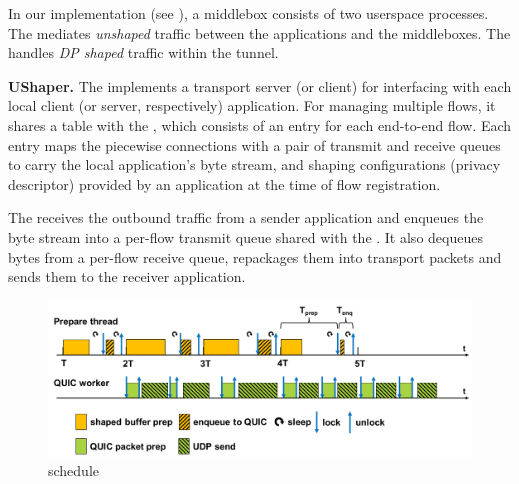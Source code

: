 In our implementation (see ), a middlebox consists of
two userspace processes. The
{\ushaper} mediates {\em unshaped} traffic between the applications and the
middleboxes. The {\dshaper} handles {\em DP shaped} traffic within the tunnel.

\textbf{UShaper.}
The {\ushaper} implements a transport server (or client) for interfacing with
each local client (or server, respectively) application.
For managing multiple flows, it shares a {\flowmap} table with the {\dshaper},
which consists of an entry for each end-to-end flow. Each entry maps the
piecewise connections with
a pair of transmit and receive queues to carry the local application's byte
stream, and shaping configurations (\eg privacy descriptor) provided by an
application at the time of flow registration.

The {\ushaper} receives the outbound traffic from a sender application
and enqueues the byte stream into a per-flow transmit queue shared with the
{\dshaper}.
It also dequeues bytes from a per-flow receive queue, repackages them
into transport packets and sends them to the receiver application.

\begin{figure}[t]
    \centering
    \includegraphics[width=\columnwidth]{schedule5.pdf}
    \caption{{\dshaper} schedule}
    \vspace{-0.4cm}
    \label{fig:middlebox-schedule}
\end{figure}


